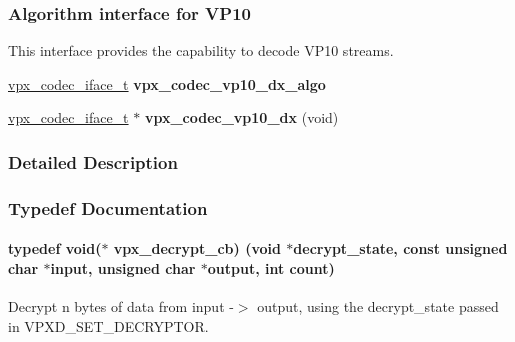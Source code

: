 \subsubsection*{Algorithm interface for V\+P10}
\label{_amgrpd19ab123522066fb3d11d80719b68480}%
This interface provides the capability to decode V\+P10 streams. \begin{DoxyCompactItemize}
\item 
\hyperlink{group__codec_gae99c3b04f4a567a311211cce3ae6b83b}{vpx\+\_\+codec\+\_\+iface\+\_\+t} {\bfseries vpx\+\_\+codec\+\_\+vp10\+\_\+dx\+\_\+algo}\hypertarget{group__vp8__decoder_ga62abeb12e08dfba0553f0004421224a2}{}\label{group__vp8__decoder_ga62abeb12e08dfba0553f0004421224a2}

\item 
\hyperlink{group__codec_gae99c3b04f4a567a311211cce3ae6b83b}{vpx\+\_\+codec\+\_\+iface\+\_\+t} $\ast$ {\bfseries vpx\+\_\+codec\+\_\+vp10\+\_\+dx} (void)\hypertarget{group__vp8__decoder_gac3a1c2f8765242a20a12c31b942abe42}{}\label{group__vp8__decoder_gac3a1c2f8765242a20a12c31b942abe42}

\end{DoxyCompactItemize}


\subsubsection{Detailed Description}


\subsubsection{Typedef Documentation}
\paragraph[{\texorpdfstring{vpx\+\_\+decrypt\+\_\+cb}{vpx_decrypt_cb}}]{\setlength{\rightskip}{0pt plus 5cm}typedef void($\ast$ vpx\+\_\+decrypt\+\_\+cb) (void $\ast$decrypt\+\_\+state, const unsigned char $\ast$input, unsigned char $\ast$output, int count)}\hypertarget{group__vp8__decoder_ga10cdcbbc04aa831558688f4a4149fcbd}{}\label{group__vp8__decoder_ga10cdcbbc04aa831558688f4a4149fcbd}
Decrypt n bytes of data from input -\/$>$ output, using the decrypt\+\_\+state passed in V\+P\+X\+D\+\_\+\+S\+E\+T\+\_\+\+D\+E\+C\+R\+Y\+P\+T\+OR. 
